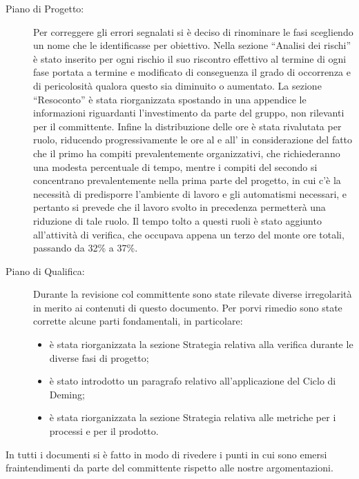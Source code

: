\begin{description}
\item[Piano di Progetto:] Per correggere gli errori segnalati si è deciso di rinominare le fasi scegliendo un nome che le identificasse per obiettivo. Nella sezione “Analisi dei rischi” è stato inserito per ogni rischio il suo riscontro effettivo al termine di ogni fase portata a termine e modificato di conseguenza il grado di occorrenza e di pericolosità qualora questo sia diminuito o aumentato. La sezione “Resoconto” è stata riorganizzata spostando in una appendice le informazioni riguardanti l'investimento da parte del gruppo, non rilevanti per il committente. Infine la distribuzione delle ore è stata rivalutata per ruolo, riducendo progressivamente le ore al  e all' in considerazione del fatto che il primo ha compiti prevalentemente organizzativi, che richiederanno una modesta percentuale di tempo, mentre i compiti del secondo si concentrano prevalentemente nella prima parte del progetto, in cui c'è la necessità di predisporre l'ambiente di lavoro e gli automatismi necessari, e pertanto si prevede che il lavoro svolto in precedenza permetterà una riduzione di tale ruolo. Il tempo tolto a questi ruoli è stato aggiunto all'attività di verifica, che occupava appena un terzo del monte ore totali, passando da 32\% a 37\%.
\item[Piano di Qualifica:] Durante la revisione col committente sono state rilevate diverse irregolarità in merito ai contenuti di questo documento. Per porvi rimedio sono state corrette alcune parti fondamentali, in particolare:
\begin{itemize}
\item è stata riorganizzata la sezione Strategia relativa alla verifica durante le diverse fasi di progetto;
\item è stato introdotto un paragrafo relativo all'applicazione del Ciclo di Deming;
\item è stata riorganizzata la sezione Strategia relativa alle metriche per i processi e per il prodotto.
\end{itemize}
\end{description}
In tutti i documenti si è fatto in modo di rivedere i punti in cui sono emersi fraintendimenti da parte del committente rispetto alle nostre argomentazioni.
